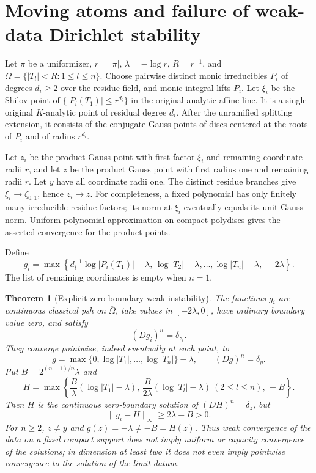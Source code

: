 \documentclass[11pt,a4paper]{article}
\numberwithin{equation}{section}
\newtheorem{theorem}{Theorem}[section]
\theoremstyle{definition}
\theoremstyle{remark}
\begin{document}


\section{Moving atoms and failure of weak-data Dirichlet stability}
\label{sec:r3-moving-atomic-dirichlet}

Let $\pi$ be a uniformizer, $r=|\pi|$, $\lambda=-\log r$,
$R=r^{-1}$, and
$\Omega=\{|T_l|<R:1\leq l\leq n\}$.
Choose pairwise distinct monic irreducibles $\overline P_i$ of
degrees $d_i\geq2$ over the residue field, and monic integral
lifts $P_i$. Let $\xi_i$ be the Shilov point of
$\{|P_i(T_1)|\leq r^{d_i}\}$ in the original analytic affine line.
It is a single original $K$-analytic point of residual degree
$d_i$. After the unramified splitting extension, it consists of
the conjugate Gauss points of discs centered at the roots of $P_i$
and of radius $r^{d_i}$.

Let $z_i$ be the product Gauss point with first factor $\xi_i$
and remaining coordinate radii $r$, and let $z$ be the product
Gauss point with first radius one and remaining radii $r$.
Let $y$ have all coordinate radii one. The distinct residue branches
give $\xi_i\to\zeta_{0,1}$, hence $z_i\to z$.
For completeness, a fixed polynomial has only finitely many
irreducible residue factors; its norm at $\xi_i$ eventually equals
its unit Gauss norm. Uniform polynomial approximation on compact
polydiscs gives the asserted convergence for the product points.

Define
\begin{equation}
 g_i=\max\left\{d_i^{-1}\log|P_i(T_1)|-\lambda,\,
       \log|T_2|-\lambda,\ldots,\log|T_n|-\lambda,\,-2\lambda\right\}.
 \label{eq:r3-moving-atomic-potentials}
\end{equation}
The list of remaining coordinates is empty when $n=1$.

\begin{theorem}[Explicit zero-boundary weak instability]
\label{thm:r3-moving-atomic-dirichlet}
The functions $g_i$ are continuous classical psh on $\overline\Omega$,
take values in $[-2\lambda,0]$, have ordinary boundary value zero,
and satisfy
\[
 (Dg_i)^n=\delta_{z_i}.
\]
They converge pointwise, indeed eventually at each point, to
\[
 g=\max\{0,\log|T_1|,\ldots,\log|T_n|\}-\lambda,\qquad
 (Dg)^n=\delta_y.
\]
Put $B=2^{(n-1)/n}\lambda$ and
\[
 H=\max\left\{
     \frac B\lambda(\log|T_1|-\lambda),\,
     \frac B{2\lambda}(\log|T_l|-\lambda)\ (2\leq l\leq n),\,
     -B\right\}.
\]
Then $H$ is the continuous zero-boundary solution of
$(DH)^n=\delta_z$, but
\[
 \|g_i-H\|_\infty\geq2\lambda-B>0.
\]
For $n\geq2$, $z\ne y$ and $g(z)=-\lambda\ne-B=H(z)$.
Thus weak convergence of the data on a fixed compact support
does not imply uniform or capacity convergence of the solutions;
in dimension at least two it does not even imply pointwise
convergence to the solution of the limit datum.
\end{theorem}
\end{document}
